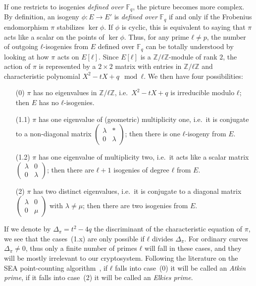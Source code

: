 \documentclass{article}
\newcommand{\F}{\mathbb{F}}
\theoremstyle{definition}
\begin{document}
If one restricts to isogenies \emph{defined over $\F_q$}, the picture
becomes more complex.  By definition, an isogeny $ϕ:E→E'$ is
\emph{defined over} $\F_q$ if and only if the Frobenius endomorphism
$π$ stabilizes $\ker ϕ$. If $ϕ$ is cyclic, this is equivalent to
saying that $π$ acts like a scalar on the points of $\ker ϕ$.  Thus,
for any prime $ℓ≠p$, the number of outgoing $ℓ$-isogenies from $E$ 
defined over $\F_q$ can be
totally understood by looking at how $π$ acts on $E[ℓ]$. Since $E[ℓ]$
is a $ℤ/ℓℤ$-module of rank $2$, the action of $π$ is represented by a
$2×2$ matrix with entries in $ℤ/ℓℤ$ and characteristic polynomial
$X^2-tX+q\mod ℓ$. We then have four possibilities:
\begin{itemize}
\item[(0)] $π$ has no eigenvalues in $ℤ/ℓℤ$, i.e.\ $X^2-tX+q$ is
  irreducible modulo $ℓ$; then $E$ has no $ℓ$-isogenies.
\item[(1.1)] $π$ has one eigenvalue of (geometric) multiplicity one,
  i.e.\ it is conjugate to a non-diagonal matrix
  $\left(\begin{smallmatrix}λ&*\\0&λ\end{smallmatrix}\right)$; then
  there is one $ℓ$-isogeny from $E$.
\item[(1.2)] $π$ has one eigenvalue of multiplicity two, i.e.\ it acts
  like a scalar matrix
  $\left(\begin{smallmatrix}λ&0\\0&λ\end{smallmatrix}\right)$; then
  there are $ℓ+1$ isogenies of degree $ℓ$ from $E$.
\item[(2)] $π$ has two distinct eigenvalues, i.e.\ it is conjugate to a
  diagonal matrix
  $\left(\begin{smallmatrix}λ&0\\0&μ\end{smallmatrix}\right)$
	with $\lambda\neq\mu$; then
  there are two isogenies from $E$.
\end{itemize}

If we denote by $Δ_π=t^2-4q$ the discriminant of the characteristic
equation of $π$, we see that the cases~(1.x) are only possible if $ℓ$
divides $Δ_π$.  For ordinary curves $Δ_π≠0$, thus only a finite number
of primes $ℓ$ will fall in these cases, and they will be mostly
irrelevant to our cryptosystem. Following the literature on the SEA
point-counting algorithm~\cite{schoof95,todo}, if $ℓ$ falls into
case~(0) it will be called an \emph{Atkin prime}, if it falls into
case~(2) it will be called an \emph{Elkies prime}.
\end{document}
